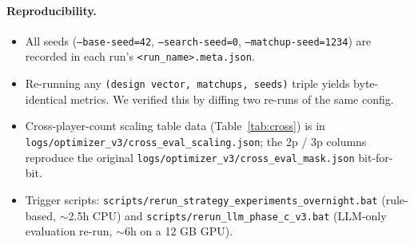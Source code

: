 \documentclass[10pt]{article}
\begin{document}
\paragraph{Reproducibility.}
\begin{itemize}[leftmargin=1.2em,itemsep=1pt]
\item All seeds (\texttt{--base-seed=42}, \texttt{--search-seed=0},
\texttt{--matchup-seed=1234}) are recorded in each run's
\texttt{<run\_name>.meta.json}.
\item Re-running any \texttt{(design vector, matchups, seeds)}
triple yields byte-identical metrics. We verified this by diffing
two re-runs of the same config.
\item Cross-player-count scaling table data
(Table~\ref{tab:cross}) is in
\texttt{logs/optimizer\_v3/cross\_eval\_scaling.json}; the 2p / 3p
columns reproduce the original
\texttt{logs/optimizer\_v3/cross\_eval\_mask.json} bit-for-bit.
\item Trigger scripts:
\texttt{scripts/rerun\_strategy\_experiments\_overnight.bat}
(rule-based, $\sim$2.5h CPU) and
\texttt{scripts/rerun\_llm\_phase\_c\_v3.bat} (LLM-only evaluation re-run,
$\sim$6h on a 12 GB GPU).
\end{itemize}
\end{document}
